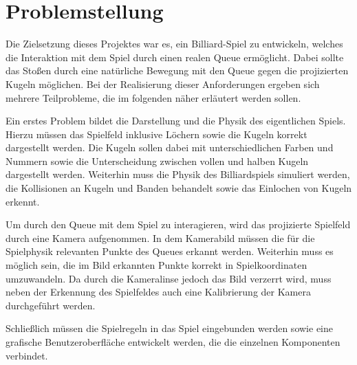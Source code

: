 
\chapter{Problemstellung}
Die Zielsetzung dieses Projektes war es, ein Billiard-Spiel zu entwickeln, welches die Interaktion mit dem Spiel durch einen realen Queue ermöglicht.
Dabei sollte das Stoßen durch eine natürliche Bewegung mit den Queue gegen die projizierten Kugeln möglichen.
Bei der Realisierung dieser Anforderungen ergeben sich mehrere Teilprobleme, die im folgenden näher erläutert werden sollen.

Ein erstes Problem bildet die Darstellung und die Physik des eigentlichen Spiels. Hierzu müssen das Spielfeld inklusive Löchern sowie die Kugeln korrekt dargestellt werden. 
Die Kugeln sollen dabei mit unterschiedlichen Farben und Nummern sowie die Unterscheidung zwischen vollen und halben Kugeln dargestellt werden.
Weiterhin muss die Physik des Billiardspiels simuliert werden, die Kollisionen an Kugeln und Banden behandelt sowie das Einlochen von Kugeln erkennt.

Um durch den Queue mit dem Spiel zu interagieren, wird das projizierte Spielfeld durch eine Kamera aufgenommen. 
In dem Kamerabild müssen die für die Spielphysik relevanten Punkte des Queues erkannt werden.
Weiterhin muss es möglich sein, die im Bild erkannten Punkte korrekt in Spielkoordinaten umzuwandeln.
Da durch die Kameralinse jedoch das Bild verzerrt wird, muss neben der Erkennung des Spielfeldes auch eine Kalibrierung der Kamera durchgeführt werden.

Schließlich müssen die Spielregeln in das Spiel eingebunden werden sowie eine grafische Benutzeroberfläche entwickelt werden, die die einzelnen Komponenten verbindet.


